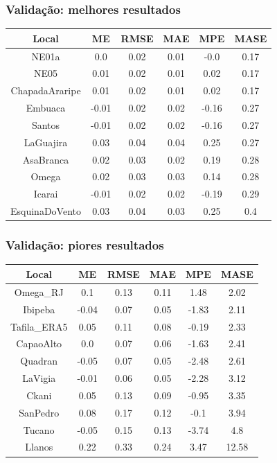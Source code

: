 \documentclass[mathserif,serif]{beamer}
\begin{document}
\begin{frame}
	\frametitle{Validação: melhores resultados}
	\begin{table}[h]
		\centering
		\begin{tabular}{ |c|c|c|c|c|c| } 
			\hline
			\textbf{Local}&\textbf{ME}&\textbf{RMSE}&\textbf{MAE}&\textbf{MPE}&\textbf{MASE}\\
			\hline
			NE01a&0.0&0.02&0.01&-0.0&0.17\\
			\hline
			NE05&0.01&0.02&0.01&0.02&0.17\\
			\hline
			ChapadaAraripe&0.01&0.02&0.01&0.02&0.17\\
			\hline
			Embuaca&-0.01&0.02&0.02&-0.16&0.27\\
			\hline
			Santos&-0.01&0.02&0.02&-0.16&0.27\\
			\hline
			LaGuajira&0.03&0.04&0.04&0.25&0.27\\
			\hline
			AsaBranca&0.02&0.03&0.02&0.19&0.28\\
			\hline
			Omega&0.02&0.03&0.03&0.14&0.28\\
			\hline
			Icarai&-0.01&0.02&0.02&-0.19&0.29\\
			\hline
			EsquinaDoVento&0.03&0.04&0.03&0.25&0.4\\
			\hline
		\end{tabular}
	\end{table}
\end{frame}

\begin{frame}
	\frametitle{Validação: piores resultados}
	\begin{table}[h]
		\centering
		\begin{tabular}{ |c|c|c|c|c|c| } 
			\hline
			\textbf{Local}&\textbf{ME}&\textbf{RMSE}&\textbf{MAE}&\textbf{MPE}&\textbf{MASE}\\
			\hline
			Omega\_RJ&0.1&0.13&0.11&1.48&2.02\\
			\hline
			Ibipeba&-0.04&0.07&0.05&-1.83&2.11\\
			\hline
			Tafila\_ERA5&0.05&0.11&0.08&-0.19&2.33\\
			\hline
			CapaoAlto&0.0&0.07&0.06&-1.63&2.41\\
			\hline
			Quadran&-0.05&0.07&0.05&-2.48&2.61\\
			\hline
			LaVigia&-0.01&0.06&0.05&-2.28&3.12\\
			\hline
			Ckani&0.05&0.13&0.09&-0.95&3.35\\
			\hline
			SanPedro&0.08&0.17&0.12&-0.1&3.94\\
			\hline
			Tucano&-0.05&0.15&0.13&-3.74&4.8\\
			\hline
			Llanos&0.22&0.33&0.24&3.47&12.58\\
			\hline
		\end{tabular}
	\end{table}
\end{frame}
\end{document}
